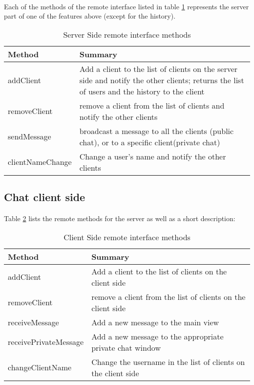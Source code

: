 \documentclass[times, 8pt,twocolumn]{article}
\begin{document}
\paragraph{} Each of the methods of the remote interface listed in  table \ref{tab:serverprovide} represents the server part of one of the features above (except for the history).
\begin{small}
  \begin{table}[H]
  \begin{center}
      \begin{tabular}{ | l | p{5cm} |}
      \hline
      Method & Summary \\ \hline
      addClient & Add a client to the list of clients on the server side and notify the other clients; returns the list of users and the history to the client\\ \hline 
      removeClient & remove a client from the list of clients and notify the other clients\\ \hline
      sendMessage &  broadcast a message to all the clients (public chat), or to a specific client(private chat)\\ \hline
      clientNameChange & Change a user's name and notify the other clients \\ \hline
      \end{tabular}
  \end{center}
  \caption{Server Side remote interface methods}
  \label{tab:serverprovide}
  \end{table}
\end{small}
\subsection{Chat client side}
\paragraph{}Table \ref{tab:clientprovide} lists the remote methods for the server as well as a short description:
\begin{small}
  \begin{table}[H]
  \begin{center}
      \begin{tabular}{ | l | p{5cm} |}
      \hline
      Method & Summary \\ \hline
      addClient & Add a client to the list of clients on the client side \\ \hline 
      removeClient & remove a client from the list of clients on the client side \\ \hline
      receiveMessage & Add a new message to the main view \\ \hline
      receivePrivateMessage &  Add a new message to the appropriate private chat window \\ \hline
      changeClientName & Change the username in the list of clients on the client side \\ \hline
      \end{tabular}
  \end{center}
  \caption{Client Side remote interface methods}
  \label{tab:clientprovide}
  \end{table}
  \end{small}
\end{document}
